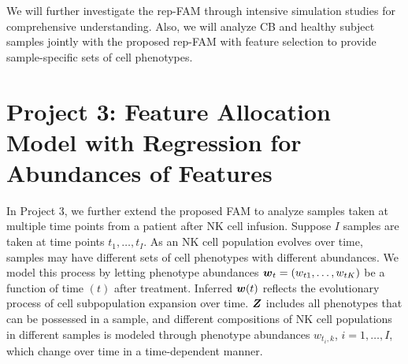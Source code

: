 \documentclass[12pt,]{article}
\newcommand{\bZ}{\mbox{\boldmath $Z$}}
\newcommand{\bw}{\mbox{\boldmath $w$}}
\begin{document}
We will further investigate the rep-FAM through intensive simulation studies
for comprehensive understanding. Also, we will analyze CB and healthy subject
samples jointly with the proposed rep-FAM with feature selection to provide
sample-specific sets of cell phenotypes.







\section{Project 3: Feature Allocation Model with Regression for Abundances of
Features}\label{sec:proj3}
In Project 3, we further extend the proposed FAM to analyze samples taken at
multiple time points from a patient after NK cell infusion. Suppose $I$ samples
are taken at time points $t_1, \ldots, t_I$.   As an NK cell population evolves
over time, samples may have different sets of cell phenotypes with different
abundances. We model this process by letting phenotype abundances
$\bw_{t}=(w_{t1}, \ldots, w_{tK})$ be a function of time $(t)$ after treatment.
Inferred $\bw(t)$ reflects the evolutionary process of cell subpopulation
expansion over time.   $\bZ$ includes all phenotypes that can be possessed in a
sample, and different compositions of NK cell populations in different samples is
modeled through phenotype abundances $w_{t_i, k}$, $i=1, \ldots, I$, which
change over time in a time-dependent manner.
\end{document}
